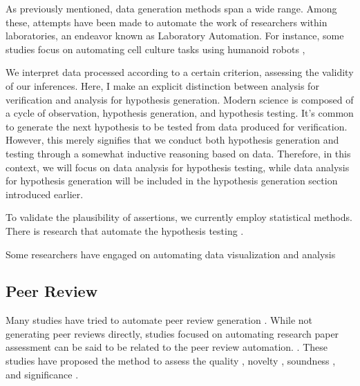 \documentclass{book}
\begin{document}
As previously mentioned, data generation methods span a wide range. Among these, attempts have been made to automate the work of researchers within laboratories, an endeavor known as Laboratory Automation. For instance, 
some studies focus on automating cell culture tasks using humanoid robots \cite{ochiai2021variable},

We interpret data processed according to a certain criterion, assessing the validity of our inferences. Here, I make an explicit distinction between analysis for verification and analysis for hypothesis generation. Modern science is composed of a cycle of observation, hypothesis generation, and hypothesis testing. It's common to generate the next hypothesis to be tested from data produced for verification. However, this merely signifies that we conduct both hypothesis generation and testing through a somewhat inductive reasoning based on data. Therefore, in this context, we will focus on data analysis for hypothesis testing, while data analysis for hypothesis generation will be included in the hypothesis generation section introduced earlier.

To validate the plausibility of assertions, we currently employ statistical methods. There is research that automate the hypothesis testing \cite{gil2016automated}. 

Some researchers have engaged on automating data visualization and analysis \cite{bavishi2021vizsmith,bavishi2022tools}



\subsection{Peer Review}
Many studies have tried to automate peer review generation \cite{thelwall2019artificial,li2019generating,schulz2022future,yuan2022can,yuan2022kid,lin2021automated1,lin2021automated2,kumar2022investigations,bharti2022can,uban2021generating,wang2020reviewrobot}. While not generating peer reviews directly, studies focused on automating research paper assessment  can be said to be related to the peer review automation. \cite{kousha2022artificial,li2020multi,huang2018deep}. These studies have proposed the method to assess the quality \cite{thelwall2022predicting,thelwall2022can}, novelty \cite{pelletier2022novelpy,amplayo2019evaluating,shibayama2020measuring}, soundness \cite{cabanac2022decontamination}, and significance \cite{zong2022citation,xia2023review,soni2022predicting,manghi2021new,soni2021follow,van2020schubert,mckeown2016predicting}.
\end{document}
